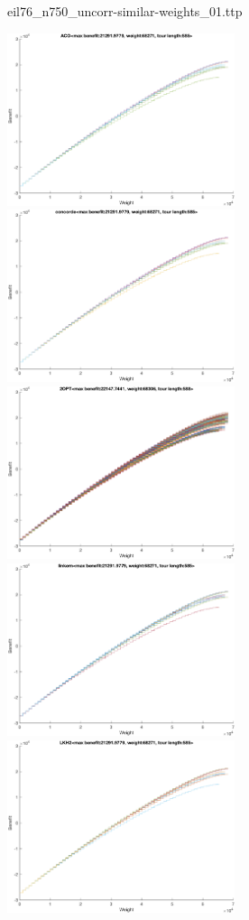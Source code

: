 \documentclass{article}
\begin{document}
\newpage
eil76\_n750\_uncorr-similar-weights\_01.ttp

\noindent
\includegraphics[width=0.5\textwidth]{eil76figs/eil76_n750_uncorr-similar-weights_01.ttp.aco.txt.eps}
\includegraphics[width=0.5\textwidth]{eil76figs/eil76_n750_uncorr-similar-weights_01.ttp.con.txt.eps}
\includegraphics[width=0.5\textwidth]{eil76figs/eil76_n750_uncorr-similar-weights_01.ttp.inv.txt.eps}
\includegraphics[width=0.5\textwidth]{eil76figs/eil76_n750_uncorr-similar-weights_01.ttp.lkh.txt.eps}
\includegraphics[width=0.5\textwidth]{eil76figs/eil76_n750_uncorr-similar-weights_01.ttp.lkh2.txt.eps}
\end{document}
